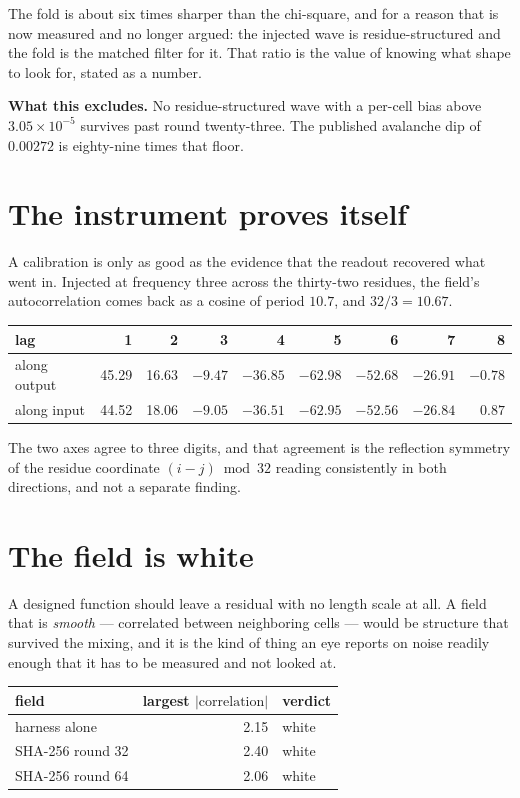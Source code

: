 The fold is about six times sharper than the chi-square, and for a reason that is now measured
and no longer argued: the injected wave is residue-structured and the fold is the matched filter for
it. That ratio is the value of knowing what shape to look for, stated as a number.

\textbf{What this excludes.} No residue-structured wave with a per-cell bias above
\(3.05 \times 10^{-5}\) survives past round twenty-three. The published avalanche dip of
\(0.00272\) is eighty-nine times that floor.

\section{The instrument proves itself}

A calibration is only as good as the evidence that the readout recovered what went in. Injected at
frequency three across the thirty-two residues, the field's autocorrelation comes back as a cosine
of period \(10.7\), and \(32/3 = 10.67\).

\begin{center}
\begin{tabular}{lrrrrrrrr}
\toprule
lag & 1 & 2 & 3 & 4 & 5 & 6 & 7 & 8 \\
\midrule
along output & 45.29 & 16.63 & \(-9.47\) & \(-36.85\) & \(-62.98\) & \(-52.68\) & \(-26.91\) & \(-0.78\) \\
along input & 44.52 & 18.06 & \(-9.05\) & \(-36.51\) & \(-62.95\) & \(-52.56\) & \(-26.84\) & \(0.87\) \\
\bottomrule
\end{tabular}
\end{center}

The two axes agree to three digits, and that agreement is the reflection symmetry of the residue coordinate
\((i - j) \bmod 32\) reading consistently in both directions, and not a separate finding.

\section{The field is white}

A designed function should leave a residual with no length scale at all. A field that is
\emph{smooth} --- correlated between neighboring cells --- would be structure that survived the
mixing, and it is the kind of thing an eye reports on noise readily enough that it has to be
measured and not looked at.

\begin{center}
\begin{tabular}{lrl}
\toprule
field & largest \(|\text{correlation}|\) & verdict \\
\midrule
harness alone & 2.15 & white \\
SHA-256 round 32 & 2.40 & white \\
SHA-256 round 64 & 2.06 & white \\
\bottomrule
\end{tabular}
\end{center}


